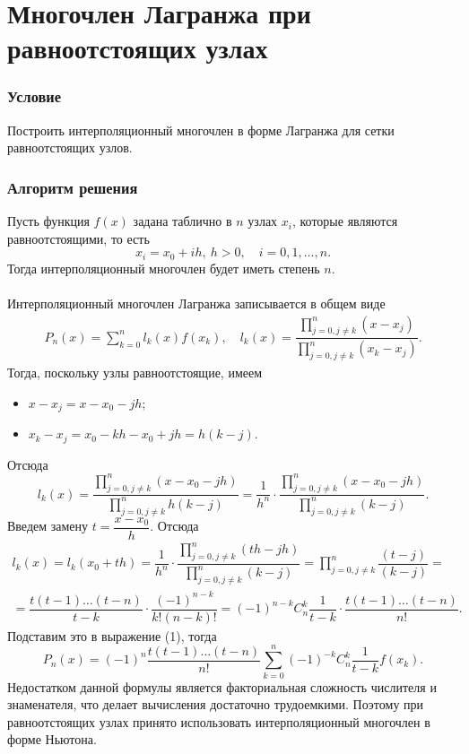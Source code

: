 \documentclass[a4paper, 12pt]{article}
\begin{document}
	\section*{Многочлен Лагранжа при равноотстоящих узлах}
	\subsubsection*{Условие}
	Построить интерполяционный многочлен в форме Лагранжа для сетки равноотстоящих узлов. 
	\subsubsection*{Алгоритм решения}
	Пусть функция $f(x)$ задана таблично в $n$ узлах $x_i$, которые являются равноотстоящими, то есть $$x_i = x_0 + ih,\ h>0,\quad i = 0,1,\ldots,n.$$
	Тогда интерполяционный многочлен будет иметь степень $n$.\\\\
	Интерполяционный многочлен Лагранжа записывается в общем виде \begin{eqnarray}
	P_n(x) = \sum_{k=0}^{n}l_k(x) f(x_k),\quad l_k(x) = \dfrac{\prod\limits_{j=0, j\ne k}^n (x-x_j)}{\prod\limits_{j=0, j\ne k}^n (x_k-x_j)}.
	\end{eqnarray}
	Тогда, поскольку узлы равноотстоящие, имеем \begin{itemize}
		\item $x - x_j = x - x_0 - jh$;
		\item $x_k - x_j = x_0 - kh - x_0 + jh = h(k-j)$.
	\end{itemize}
	Отсюда $$l_k(x) = \dfrac{\prod\limits_{j=0, j\ne k}^n (x - x_0 - jh)}{\prod\limits_{j=0, j\ne k}^n h(k-j)} = \dfrac{1}{h^n}\cdot \dfrac{\prod\limits_{j=0, j\ne k}^n (x - x_0 - jh)}{\prod\limits_{j=0, j\ne k}^n (k-j)}.$$
	Введем замену $t = \dfrac{x-x_0}{h}$.
	Отсюда \begin{multline*}
		l_k(x) = l_k(x_0 + th) = \dfrac{1}{h^n}\cdot \dfrac{\prod\limits_{j=0, j\ne k}^n (th - jh)}{\prod\limits_{j=0, j\ne k}^n (k-j)}=\prod\limits_{j=0, j\ne k}^n\dfrac{(t - j)}{(k-j)}=\\=\dfrac{t(t-1)\ldots (t-n)}{t-k}\cdot \dfrac{(-1)^{n-k}}{k!(n-k)!} = (-1)^{n-k} C^k_n\dfrac{1}{t-k}\cdot \dfrac{t(t-1)\ldots (t-n)}{n!}.
	\end{multline*}
	Подставим это в выражение (1), тогда $$P_n(x) = (-1)^n\dfrac{t(t-1)\ldots (t-n)}{n!}\sum_{k=0}^{n}(-1)^{-k}C^k_n\dfrac{1}{t-k}f(x_k).$$
	Недостатком данной формулы является факториальная сложность числителя и знаменателя, что делает вычисления достаточно трудоемкими. Поэтому при равноотстоящих узлах принято использовать интерполяционный многочлен в форме Ньютона.
\end{document}
